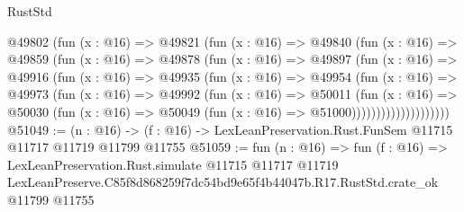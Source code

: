 \begin{lexlean}{RustStd}
\begin{coremodule}
              @49802
                (fun (x : @16) =>
                @49821
                  (fun (x : @16) =>
                  @49840
                    (fun (x : @16) =>
                    @49859
                      (fun (x : @16) =>
                      @49878
                        (fun (x : @16) =>
                        @49897
                          (fun (x : @16) =>
                          @49916
                            (fun (x : @16) =>
                            @49935
                              (fun (x : @16) =>
                              @49954
                                (fun (x : @16) =>
                                @49973
                                  (fun (x : @16) =>
                                  @49992
                                    (fun (x : @16) =>
                                    @50011
                                      (fun (x : @16) =>
                                      @50030
                                        (fun (x : @16) =>
                                        @50049 (fun (x : @16) => @51000))))))))))))))))))))
@51049 := (n : @16) ->
  (f : @16) -> LexLeanPreservation.Rust.FunSem @11715 @11717 @11719 @11799 @11755
@51059 := fun (n : @16) =>
  fun (f : @16) =>
  LexLeanPreservation.Rust.simulate
    @11715
    @11717
    @11719
    LexLeanPreserve.C85f8d868259f7dc54bd9e65f4b44047b.R17.RustStd.crate_ok
    @11799
    @11755
\end{coremodule}
\end{lexlean}
